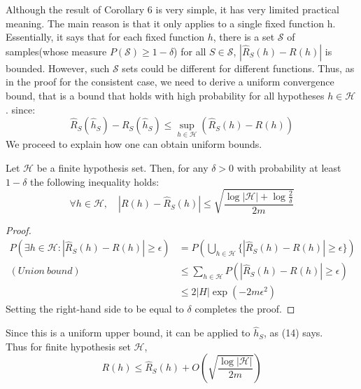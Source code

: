 Although the result of Corollary 6 is very simple, it has very limited practical meaning. The main reason is that it only applies to a single fixed function h. Essentially, it says that for each fixed function $h$, there is a set $\mathcal{S}$ of samples(whose measure $P(\mathcal{S}) \geq 1-\delta$) for all $S\in \mathcal{S}$, $|\hat{R}_S(h)-R(h)|$ is bounded. However, such $\mathcal{S}$ sets could be different for different functions.
Thus, as in the proof for the consistent case, we need to derive a uniform convergence bound, that is a bound that holds with high probability for all hypotheses $h \in \mathcal{H}$. since:
\begin{equation}
\hat{R}_S(\hat{h}_S)-R_S(\hat{h}_S) \leq \sup_{h \in \mathcal{H}}(\hat{R}_S(h)-R(h))
\end{equation}
We proceed to explain how one can obtain uniform bounds.\\

\begin{theorem}
	Let $\mathcal{H}$ be a finite hypothesis set. Then, for any $\delta>0$ with probability at least $1-\delta$ the following inequality holds:
	$$\forall h \in \mathcal{H}, \quad |R(h) - \hat{R}_S(h)| \leq \sqrt{\frac{\log |\mathcal{H}| + \log \frac{2}{\delta}}{2m}}$$
\end{theorem}

\begin{proof}
	\begin{align}
	P\left( \exists h \in \mathcal{H}: |\hat{R}_S (h)-R(h)| \geq \epsilon \right)
	&= P\left(\bigcup_{h \in \mathcal{H}} \{ |\hat{R}_S (h)-R(h)| \geq \epsilon \} \right) \\
	(Union\ bound)&\leq \sum_{h \in \mathcal{H}} P\left( |\hat{R}_S (h)-R(h)| \geq \epsilon \right) \\
	&\leq 2|H|\exp(-2m\epsilon^2)      	
	\end{align}
	Setting the right-hand side to be equal to $\delta$ completes the proof.
\end{proof}

Since this is a uniform upper bound, it can be applied to $\hat{h}_S$, as (14) says. \\

Thus for finite hypothesis set $\mathcal{H}$,
\begin{equation}
R(h) \leq \hat{R}_S(h) + O\left( \sqrt{\frac{\log |\mathcal{H}|}{2m}} \right)
\end{equation}

